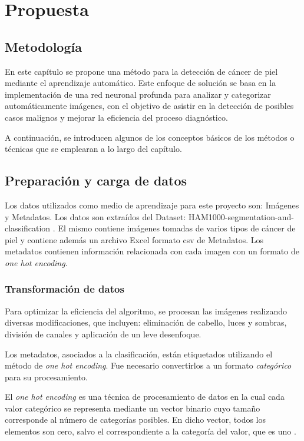 \chapter{Propuesta}\label{chapter:proposal}

\section{Metodología}\label{sec:method}
En este capítulo se propone una método para la detección de cáncer de piel mediante el aprendizaje automático. Este enfoque de solución se basa en la implementación de una  red neuronal profunda para analizar y categorizar automáticamente imágenes, con el objetivo de asistir en la detección de posibles casos malignos y mejorar la eficiencia del proceso diagnóstico.

A continuación, se introducen algunos de los conceptos básicos de los métodos o técnicas que se emplearan a lo largo del capítulo.

\section{Preparación y carga de datos}

 Los datos utilizados como medio de aprendizaje para este proyecto son: Imágenes y Metadatos. Los datos son extraídos del Dataset: HAM1000-segmentation-and-classification  \cite{ham10000}.
 El mismo contiene imágenes tomadas de varios tipos de cáncer de piel y contiene además un archivo Excel formato csv de Metadatos. Los metadatos contienen información relacionada con cada imagen con un formato de \textit{one hot encoding}.

\subsection{Transformación de datos}

Para optimizar la eficiencia del algoritmo, se procesan las imágenes realizando diversas modificaciones, que incluyen: eliminación de cabello, luces y sombras, división de canales y aplicación de un leve desenfoque.

Los metadatos, asociados a la clasificación, están etiquetados utilizando el método de \textit{one hot encoding}. Fue necesario convertirlos a un formato \textit{categórico} para su procesamiento.

El \textit{one hot encoding} es una técnica de procesamiento de datos en la cual cada valor categórico se representa mediante un vector binario cuyo tamaño corresponde al número de categorías posibles. En dicho vector, todos los elementos son cero, salvo el correspondiente a la categoría del valor, que es uno \cite{ohe}. 


